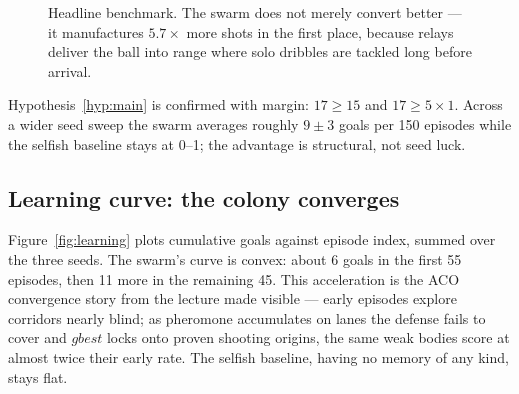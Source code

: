 \documentclass[11pt,a4paper]{article}
\begin{document}
\begin{figure}[H]
\centering
{}
\caption{Headline benchmark. The swarm does not merely convert better --- it manufactures
$5.7\times$ more shots in the first place, because relays deliver the ball into range where solo
dribbles are tackled long before arrival.}
\label{fig:headlinebar}
\end{figure}

Hypothesis~\ref{hyp:main} is confirmed with margin: $17 \ge 15$ and $17 \ge 5\times1$. Across a
wider seed sweep the swarm averages roughly $9 \pm 3$ goals per 150 episodes while the selfish
baseline stays at 0--1; the advantage is structural, not seed luck.

\subsection{Learning curve: the colony converges}

Figure~\ref{fig:learning} plots cumulative goals against episode index, summed over the three
seeds. The swarm's curve is convex: about 6 goals in the first 55 episodes, then 11 more in the
remaining 45. This acceleration is the ACO convergence story from the lecture made visible ---
early episodes explore corridors nearly blind; as pheromone accumulates on lanes the defense
fails to cover and $gbest$ locks onto proven shooting origins, the same weak bodies score at
almost twice their early rate. The selfish baseline, having no memory of any kind, stays flat.
\end{document}
